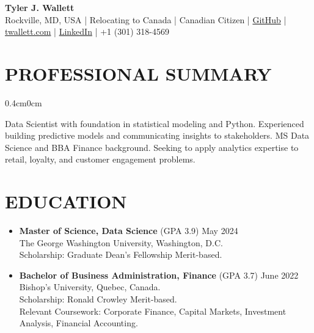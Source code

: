 \documentclass[a4paper,9pt]{extarticle}
\begin{document}
\thispagestyle{firstpage}

\begin{center}
\textbf{\Huge Tyler J. Wallett }\\[3pt] %
Rockville, MD, USA | Relocating to Canada | Canadian Citizen | \href{https://github.com/twallett}{GitHub} | \href{https://www.twallett.com}{twallett.com} | \href{https://www.linkedin.com/in/twallett/}{LinkedIn} | +1 (301) 318-4569  %
\end{center}

\section*{PROFESSIONAL SUMMARY}

\begin{adjustwidth}{0.4cm}{0cm}

Data Scientist with foundation in statistical modeling and Python. Experienced building predictive models and communicating insights to stakeholders. MS Data Science and BBA Finance background. Seeking to apply analytics expertise to retail, loyalty, and customer engagement problems.

\end{adjustwidth}

\section*{EDUCATION}

\begin{itemize}[leftmargin=0.4cm, label={}]
    \item \textbf{Master of Science, Data Science} (GPA 3.9) \hfill May 2024 \\ 
    The George Washington University, Washington, D.C. \\ 
    Scholarship: Graduate Dean's Fellowship Merit-based.
\end{itemize}

\noindent
\begin{itemize}[leftmargin=0.4cm, label={}]
    \item \textbf{Bachelor of Business Administration, Finance} (GPA 3.7) \hfill June 2022 \\
    Bishop's University, Quebec, Canada. \\ 
    Scholarship: Ronald Crowley Merit-based. \\
    Relevant Coursework: Corporate Finance, Capital Markets, Investment Analysis, Financial Accounting.
\end{itemize}
\end{document}
